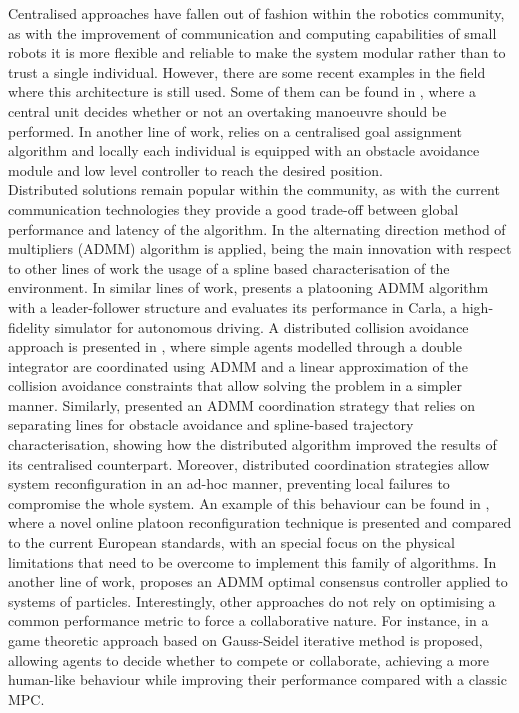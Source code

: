 \documentclass[a4paper,fleqn]{cas-sc}
\begin{document}
Centralised approaches have fallen out of fashion within the robotics community, as with the improvement of communication and computing capabilities of small robots it is more flexible and reliable to make the system modular rather than to trust a single individual. However, there are some recent examples in the field where this architecture is still used. Some of them can be found in \cite{Wang2016}, where a central unit decides whether or not an overtaking manoeuvre should be performed. In another line of work, \cite{Queralta2020} relies on a centralised goal assignment algorithm and locally each individual is equipped with an obstacle avoidance module and low level controller to reach the desired position. \\ 

Distributed solutions remain popular within the community, as with the current communication technologies they provide a good trade-off between global performance and latency of the algorithm. In \cite{DistriADMM} the alternating direction method of multipliers (ADMM) algorithm is applied, being the main innovation with respect to other lines of work the usage of a spline based characterisation of the environment. In similar lines of work, \cite{Vlachos2022} presents a platooning ADMM algorithm with a leader-follower structure and evaluates its performance in Carla, a high-fidelity simulator for autonomous driving. A distributed collision avoidance approach is presented in \cite{8550245}, where simple agents modelled through a double integrator are coordinated using ADMM and a linear approximation of the collision avoidance constraints that allow solving the problem in a simpler manner. Similarly, \cite{van2016online} presented an ADMM coordination strategy that relies on separating lines for obstacle avoidance and spline-based trajectory characterisation, showing how the distributed algorithm improved the results of its centralised counterpart. Moreover, distributed coordination strategies allow system reconfiguration in an ad-hoc manner, preventing local failures to compromise the whole system. An example of this behaviour can be found in \cite{adHoc2021}, where a novel online platoon reconfiguration technique is presented and compared to the current European standards, with an special focus on the physical limitations that need to be overcome to implement this family of algorithms. In another line of work, \cite{8648233} proposes an ADMM optimal consensus controller applied to systems of particles. Interestingly, other approaches do not rely on optimising a common performance metric to force a collaborative nature. For instance, in \cite{8648233} a game theoretic approach based on Gauss-Seidel iterative method is proposed, allowing agents to decide whether to compete or collaborate, achieving a more human-like behaviour while improving their  performance compared with a classic MPC.\\ 
\end{document}
